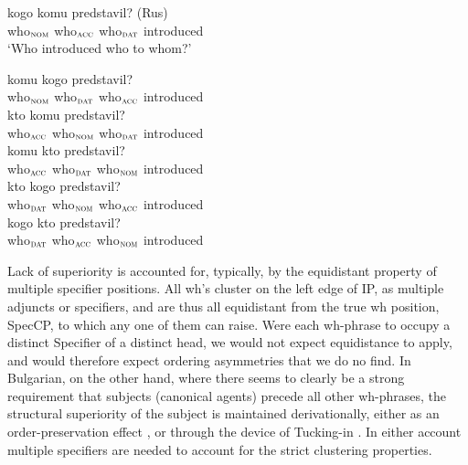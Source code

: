 \documentclass[output=paper]{langscibook}
\begin{document}
\begin{exe}
\ex \label{bai11}

\begin{xlist}
\ex \label{bai11a}
		{kogo}		{komu}		{predstavil}? \hfill (Rus) \\
who$_{\textsc{nom}}$ who$_{\textsc{acc}}$ who$_{\textsc{dat}}$ introduced \\
\glt `Who introduced who to whom?'

\ex \label{bai11b}
			{komu}	{kogo}		{predstavil}? \\
who$_{\textsc{nom}}$  who$_{\textsc{dat}}$ who$_{\textsc{acc}}$ introduced \\

\ex \label{bai11c}
	{kto}			{komu}		{predstavil}? \\
who$_{\textsc{acc}}$ who$_{\textsc{nom}}$  who$_{\textsc{dat}}$  introduced \\

\ex \label{bai11d}
		{komu}		{kto}		{predstavil}? \\
who$_{\textsc{acc}}$ who$_{\textsc{dat}}$  who$_{\textsc{nom}}$  introduced \\

\ex \label{bai11e}
	{kto}		{kogo}		{predstavil}? \\
who$_{\textsc{dat}}$  who$_{\textsc{nom}}$ who$_{\textsc{acc}}$  introduced \\

\ex \label{bai11f}
	{kogo}	{kto}		{predstavil}? \\
who$_{\textsc{dat}}$  who$_{\textsc{acc}}$   who$_{\textsc{nom}}$ introduced \\

\end{xlist}
\end{exe}

Lack of superiority is accounted for, typically, by the equidistant property of multiple specifier positions. All wh’s cluster on the left edge of IP, as multiple adjuncts or specifiers, and are thus all equidistant from the true wh position, SpecCP, to which any one of them can raise. Were each wh-phrase to occupy a distinct Specifier of a distinct head, we would not expect equidistance to apply, and would therefore expect ordering asymmetries that we do no find. In Bulgarian, on the other hand, where there seems to clearly be a strong requirement that subjects (canonical agents) precede all other wh-phrases, the structural superiority of the subject is maintained derivationally, either as an order-preservation effect \citep{Bailyn2018}, or through the device of Tucking-in \citep{Richards1997}.  In either account multiple specifiers are needed to account for the strict clustering properties. 
\end{document}
